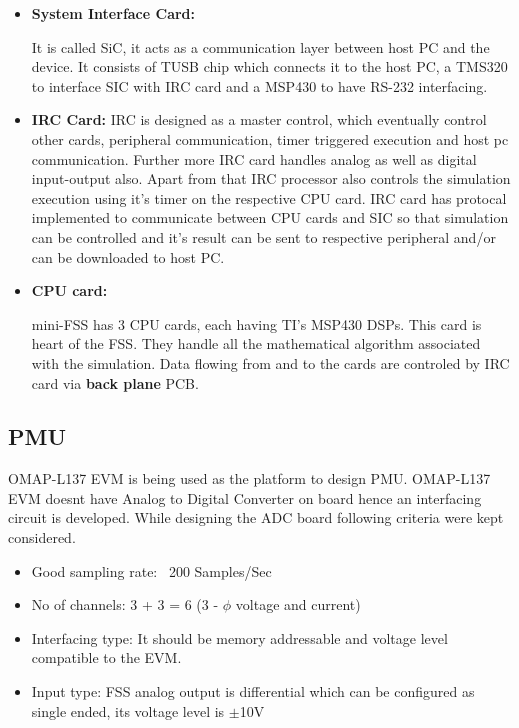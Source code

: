 \begin{itemize}
\item \textbf{System Interface Card:} 

It is called SiC, it acts as a communication layer between host PC and the device. It consists of TUSB chip which connects it to the host PC, a TMS320 to interface SIC with IRC card and a MSP430 to have RS-232 interfacing.
\item \textbf{IRC Card:} IRC is designed as a master control, which eventually control other cards, peripheral communication, timer triggered execution and host pc communication. Further more IRC card handles analog as well as digital input-output also. Apart from that IRC processor also controls the simulation execution using it's timer on the respective CPU card. IRC card has protocal implemented to communicate between CPU cards and SIC so that simulation can be controlled and it's result can be sent to respective peripheral and/or can be downloaded to host PC.

\item \textbf{CPU card:} 

mini-FSS has 3 CPU cards, each having TI's MSP430 DSPs. This card is heart of the FSS. They handle all the mathematical algorithm associated with the simulation. Data flowing from and to the cards are controled by IRC card via \textbf{back plane} PCB.
\end{itemize}

\subsection{PMU}
OMAP-L137 EVM is being used as the platform to design PMU. OMAP-L137 EVM doesnt have Analog to Digital Converter on board hence an interfacing circuit is developed. While designing the ADC board following criteria were kept considered.
\begin{itemize}
\item Good sampling rate: ~200 Samples/Sec
\item No of channels: 3 + 3 = 6 (3 - $\phi$ voltage and current) 
\item Interfacing type: It should be memory addressable and voltage level compatible  to the EVM.
\item Input type: FSS analog output is differential which can be configured as single ended, its voltage level is $\pm$10V
\end{itemize}

